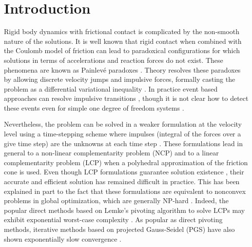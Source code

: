 %
%
%

\section{Introduction}
\label{sec:introduction}


Rigid body dynamics with frictional contact is complicated by the non-smooth
nature of the solutions. It is well known \cite{bib:baraff1993issues} that rigid
contact when combined with the Coulomb model of friction can lead to paradoxical
configurations for which solutions in terms of accelerations and reaction forces
do not exist. These phenomena are known as Painlev\'e paradoxes
\cite{bib:hogan2017regularization}. Theory resolves these paradoxes by allowing
discrete velocity jumps and impulsive forces, formally casting the problem as a
differential variational inequality \cite{bib:pang2008differential}. In practice
event based approaches can resolve impulsive transitions \cite{bib:haug1986},
though it is not clear how to detect these events even for simple one degree of
freedom systems \cite{bib:hogan2017regularization}.

Nevertheless, the problem can be solved in a weaker formulation at the velocity
level using a time-stepping scheme where impulses (integral of the forces over a
give time step) are the unknowns at each time step
\cite{bib:stewart1996implicit, bib:anitescu1997}. These formulations lead in
general to a non-linear complementarity problem (NCP) and to a linear
complementarity problem (LCP) when a polyhedral approximation of the friction
cone is used. Even though LCP formulations guarantee solution existence
\cite{bib:anitescu1997, bib:stewart1998convergence}, their accurate and
efficient solution has remained difficult in practice. This has been explained
in part to the fact that these formulations are equivalent to nonconvex problems
in global optimization, which are generally NP-hard \cite{bib:Kaufman2008}.
Indeed, the popular direct methods based on Lemke's pivoting algorithm to solve
LCPs may exhibit exponential worst-case complexity \cite{bib:baraff1994fast}. As
popular as direct pivoting methods, iterative methods based on projected
Gauss-Seidel (PGS) \cite{bib:duriez2006_realistic_haptic_rendering, bib:bullet}
have also shown exponentially slow convergence \cite{bib:erleben2007velocity}.

